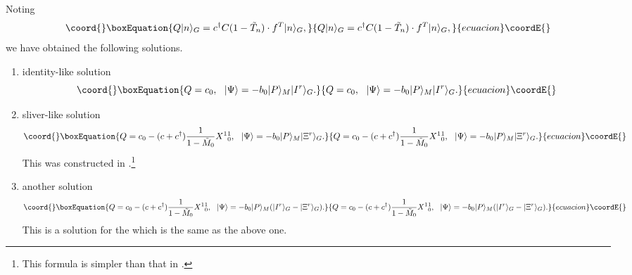 \documentclass[12pt,a4paper]{article}
\def\T{{\tilde T}}
\def\M0{{\tilde M}_0}
\begin{document}
Noting
\begin{equation}\coord{}\boxEquation{
Q|n\rangle_G=c^\dagger C(1-\T_n)\cdot f^T |n\rangle_G,
}{
Q|n\rangle_G=c^\dagger C(1-\T_n)\cdot f^T |n\rangle_G,
}{ecuacion}\coordE{}\end{equation}
we have obtained the following solutions.
\begin{enumerate}
\item identity-like solution
\begin{equation}\coord{}\boxEquation{
Q=c_0,\ \ |\Psi\rangle=-b_0|P\rangle_M |I^r\rangle_G.
}{
Q=c_0,\ \ |\Psi\rangle=-b_0|P\rangle_M |I^r\rangle_G.
}{ecuacion}\coordE{}\end{equation}

\item sliver-like solution 
\begin{equation}\coord{}\boxEquation{
Q=c_0-(c+c^\dagger){1\over1-\M0 }X^1{}^1_0,\ \ |\Psi\rangle=-b_0|P\rangle_M |\Xi^r\rangle_G.
}{
Q=c_0-(c+c^\dagger){1\over1-\M0 }X^1{}^1_0,\ \ |\Psi\rangle=-b_0|P\rangle_M |\Xi^r\rangle_G.
}{ecuacion}\coordE{}\end{equation}
This was constructed in \cite{HK}.\footnote{
	This formula is simpler than that in \cite{HK}.
}

\item another solution
\begin{equation}\coord{}\boxEquation{
Q=c_0-(c+c^\dagger){1\over1-\M0 }X^1{}^1_0,\ \ |\Psi\rangle=-b_0|P\rangle_M(|I^r\rangle_G-|\Xi^r\rangle_G).
}{
Q=c_0-(c+c^\dagger){1\over1-\M0 }X^1{}^1_0,\ \ |\Psi\rangle=-b_0|P\rangle_M(|I^r\rangle_G-|\Xi^r\rangle_G).
}{ecuacion}\coordE{}\end{equation}
This is a solution for the \coordHE{} which is the same as the above one.
\end{enumerate}
\end{document}
